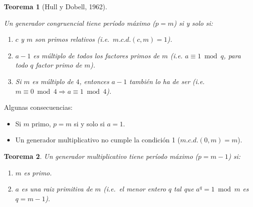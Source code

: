 \documentclass[
]{book}
\theoremstyle{break}
\newtheorem{theorem}{Teorema}[chapter]
\theoremstyle{nonumberplain}
\begin{document}
\begin{theorem}[Hull y Dobell, 1962]
\protect\hypertarget{thm:hull-dobell}{}\label{thm:hull-dobell}

Un generador congruencial tiene período máximo (\(p=m\)) si y solo si:

\begin{enumerate}
\def\labelenumi{\arabic{enumi}.}
\item
  \(c\) y \(m\) son primos relativos (i.e.~\(m.c.d.(c, m) = 1\)).
\item
  \(a-1\) es múltiplo de todos los factores primos de \(m\) (i.e.
  \(a \equiv 1 \bmod q\), para todo \(q\) factor primo de \(m\)).
\item
  Si \(m\) es múltiplo de \(4\), entonces \(a-1\) también lo ha de
  ser (i.e.~\(m \equiv 0 \bmod 4\Rightarrow a \equiv 1 \bmod 4\)).
\end{enumerate}

\end{theorem}

Algunas consecuencias:

\begin{itemize}
\item
  Si \(m\) primo, \(p=m\) si y solo si \(a=1\).
\item
  Un generador multiplicativo no cumple la condición 1 (\(m.c.d.(0, m)=m\)).
\end{itemize}

\begin{theorem}

Un generador multiplicativo tiene período máximo (\(p=m-1\)) si:

\begin{enumerate}
\def\labelenumi{\arabic{enumi}.}
\item
  \(m\) es primo.
\item
  \(a\) es una raiz primitiva de \(m\) (i.e.~el menor entero \(q\) tal
  que \(a^{q}=1 \bmod m\) es \(q=m-1\)).
\end{enumerate}

\end{theorem}
\end{document}
